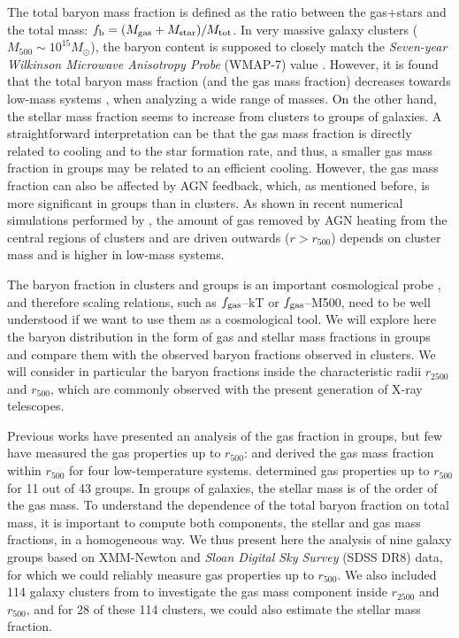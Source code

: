 \documentclass{aa}
\begin{document}
The total baryon mass fraction is defined as the ratio between the
gas+stars and the total mass:
$f_{\rm b} = (M_{\rm gas} + M_{\rm  star})/M_{\rm tot}$.  
In very massive galaxy clusters ($M_{500} \sim 10^{15} M_{\odot}$), the
baryon content is supposed to closely match the \textit{Seven-year Wilkinson
Microwave Anisotropy Probe} 
(WMAP-7) value
\citep[$f_{\rm b}^{\rm WMAP-7} = 0.169 \pm 0.009$,][]{jarosik11}.
However,  it is found that the
total baryon mass fraction (and the gas mass fraction) decreases towards
low-mass systems
\citep[e.g.,][]{lms03,gonzales07,giodini09,sun09,lagana11,zlp11,sun12}, when analyzing a wide range of masses.  
On the other hand, the stellar mass fraction seems to increase from clusters to
groups of galaxies. A straightforward interpretation can be that
the gas mass fraction is directly related to cooling and to the star formation
rate, and thus, a smaller gas mass fraction in groups may be related to an
efficient cooling.  However, the gas mass fraction can also be affected by
AGN feedback, which, as mentioned before, is more significant in groups
than in clusters. As shown in recent numerical simulations performed by
\citet{puchwein10}, the amount of gas removed by AGN heating from the
central regions of clusters and are driven outwards ($r > r_{500}$)
depends on cluster mass and is higher in low-mass systems.

The baryon fraction in clusters and groups is an important
cosmological probe \citep[e.g.,][]{allen04}, and therefore scaling relations, such
as $f_{\rm gas}$--kT or $f_{\rm gas}$--M500, need to be well understood if we want to use
them as a cosmological tool. We will explore here the baryon
distribution in the form of gas and stellar mass fractions in groups
and compare them with the observed baryon fractions observed in
clusters. We will consider in particular the baryon fractions inside the
characteristic radii $r_{2500}$ and $r_{500}$, which are commonly observed with the
present generation of X-ray telescopes.

Previous works have presented an analysis of the gas fraction in
groups, but few have measured the gas properties up to $r_{500}$:
\citet{V06} and \citet{gonzales07} derived the gas mass fraction
within $r_{500}$ for four low-temperature systems. \citet{sun09}
determined gas properties up to $r_{500}$ for 11 out of 43 groups.
In groups of galaxies, the stellar mass is of the order of
the gas mass. To understand the dependence of the total baryon
fraction on total mass, it is important to compute both components,
the stellar and gas mass fractions, in a homogeneous way.  We thus
present here the analysis of nine galaxy groups based on XMM-Newton and
\textit{Sloan Digital Sky Survey} (SDSS DR8) data, for which we could
reliably measure gas properties up to $r_{500}$.
We also included 114 galaxy clusters from \citet[][ hereafter M12]{M12}
to investigate the gas mass component inside $r_{2500}$ and $r_{500}$,
and for 28 of these 114 clusters, we could also estimate the stellar
mass fraction.
\end{document}
